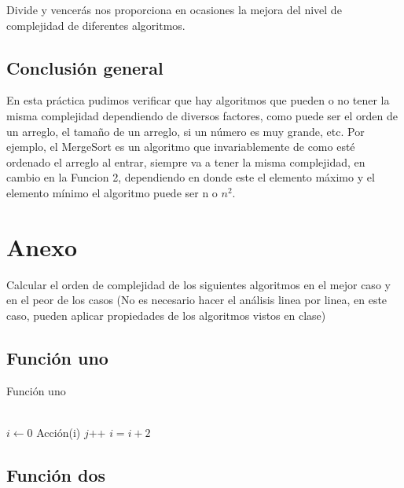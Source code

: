 \documentclass[12pt,twoside]{article}
\begin{document}
Divide y vencerás nos proporciona en ocasiones la mejora del nivel de complejidad de diferentes algoritmos.
\subsection*{Conclusión general}
    	En esta pr\'{a}ctica pudimos verificar que hay algoritmos que pueden o no tener la misma complejidad dependiendo de diversos factores, como puede ser el orden de un arreglo, el tamaño de un arreglo, si un número es muy grande, etc. Por ejemplo, el MergeSort es un algoritmo que invariablemente de como esté ordenado el arreglo al entrar, siempre va a tener la misma complejidad, en cambio en la Funcion 2, dependiendo en donde este el elemento máximo y el elemento mínimo el algoritmo puede ser n o $n^2$.
\vspace{200 mm}

\section{Anexo}
    Calcular el orden de complejidad de los siguientes algoritmos en el mejor caso y en el peor de los casos (No es necesario hacer el análisis  linea por linea, en este caso, pueden aplicar propiedades de los algoritmos vistos en clase)\\
\subsection{Función uno}
\vspace{10 mm}

\begin{algorithm}[H]
    \caption{Función uno}
      \label{euclides}
      \begin{algorithmic}[1]
		\\
            \State $i\gets 0$
					  \State Acción(i)
    				  \State $j$++
					\EndFor
					\State $i=i+2$
            \EndWhile
          \EndProcedure
		   \\
      \end{algorithmic}
  \end{algorithm}
\vspace{10 mm}
\subsection{Función dos}
\vspace{10 mm}
\end{document}
